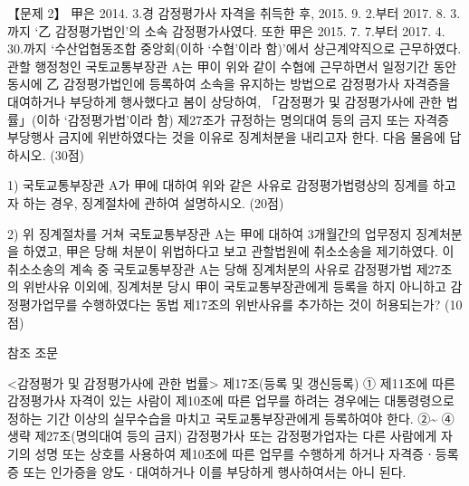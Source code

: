 \begin{longquestion}{【문제 2】}
甲은 2014. 3.경 감정평가사 자격을 취득한 후, 2015. 9. 2.부터 2017. 8. 3.까지 ‘乙 감정평가법인’의 소속 감정평가사였다. 또한 甲은 2015. 7. 7.부터 2017. 4. 30.까지 ‘수산업협동조합 중앙회(이하 ‘수협’이라 함)’에서 상근계약직으로 근무하였다. 관할 행정청인 국토교통부장관 A는 甲이 위와 같이 수협에 근무하면서 일정기간 동안 동시에 乙 감정평가법인에 등록하여 소속을 유지하는 방법으로 감정평가사 자격증을 대여하거나 부당하게 행사했다고 봄이 상당하여, 「감정평가 및 감정평가사에 관한 법률」(이하 ‘감정평가법’이라 함) 제27조가 규정하는 명의대여 등의 금지 또는 자격증 부당행사 금지에 위반하였다는 것을 이유로 징계처분을 내리고자 한다. 다음 물음에 답하시오. (30점) \par
1) 국토교통부장관 A가 甲에 대하여 위와 같은 사유로 감정평가법령상의 징계를 하고자 하는 경우, 징계절차에 관하여 설명하시오. (20점) \par
2) 위 징계절차를 거쳐 국토교통부장관 A는 甲에 대하여 3개월간의 업무정지 징계처분을 하였고, 甲은 당해 처분이 위법하다고 보고 관할법원에 취소소송을 제기하였다. 이 취소소송의 계속 중 국토교통부장관 A는 당해 징계처분의 사유로 감정평가법 제27조의 위반사유 이외에, 징계처분 당시 甲이 국토교통부장관에게 등록을 하지 아니하고 감정평가업무를 수행하였다는 동법 제17조의 위반사유를 추가하는 것이 허용되는가? (10점) \par
\begin{framedtext}
참조 조문 \par
<감정평가 및 감정평가사에 관한 법률> 
제17조(등록 및 갱신등록) ① 
제11조에 따른 감정평가사 자격이 있는 사람이 
제10조에 따른 업무를 하려는 경우에는 대통령령으로 정하는 기간 이상의 실무수습을 마치고 국토교통부장관에게 등록하여야 한다. 
②\textasciitilde{}
④ 생략 
제27조(명의대여 등의 금지) 감정평가사 또는 감정평가업자는 다른 사람에게 자기의 성명 또는 상호를 사용하여 
제10조에 따른 업무를 수행하게 하거나 자격증ㆍ등록증 또는 인가증을 양도ㆍ대여하거나 이를 부당하게 행사하여서는 아니 된다.
\end{framedtext}

\end{longquestion}
